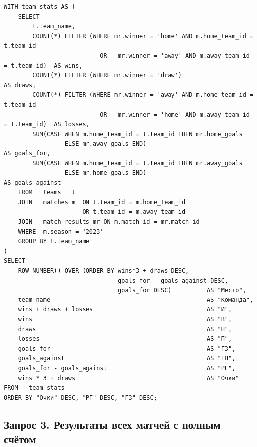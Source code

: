 \documentclass[14pt,a4paper]{extarticle}
\begin{document}
\begin{listing}[H]
\caption{Итоговая турнирная таблица (сезон 2023)}
\begin{verbatim}
WITH team_stats AS (
    SELECT
        t.team_name,
        COUNT(*) FILTER (WHERE mr.winner = 'home' AND m.home_team_id = t.team_id
                           OR   mr.winner = 'away' AND m.away_team_id = t.team_id)  AS wins,
        COUNT(*) FILTER (WHERE mr.winner = 'draw')                                   AS draws,
        COUNT(*) FILTER (WHERE mr.winner = 'away' AND m.home_team_id = t.team_id
                           OR   mr.winner = 'home' AND m.away_team_id = t.team_id)  AS losses,
        SUM(CASE WHEN m.home_team_id = t.team_id THEN mr.home_goals
                 ELSE mr.away_goals END)                                              AS goals_for,
        SUM(CASE WHEN m.home_team_id = t.team_id THEN mr.away_goals
                 ELSE mr.home_goals END)                                              AS goals_against
    FROM   teams   t
    JOIN   matches m  ON t.team_id = m.home_team_id
                      OR t.team_id = m.away_team_id
    JOIN   match_results mr ON m.match_id = mr.match_id
    WHERE  m.season = '2023'
    GROUP BY t.team_name
)
SELECT
    ROW_NUMBER() OVER (ORDER BY wins*3 + draws DESC,
                                goals_for - goals_against DESC,
                                goals_for DESC)          AS "Место",
    team_name                                            AS "Команда",
    wins + draws + losses                                AS "И",
    wins                                                 AS "В",
    draws                                                AS "Н",
    losses                                               AS "П",
    goals_for                                            AS "ГЗ",
    goals_against                                        AS "ГП",
    goals_for - goals_against                            AS "РГ",
    wins * 3 + draws                                     AS "Очки"
FROM   team_stats
ORDER BY "Очки" DESC, "РГ" DESC, "ГЗ" DESC;
\end{verbatim}
\end{listing}

\subsection{Запрос 3. Результаты всех матчей с полным счётом}
\end{document}
